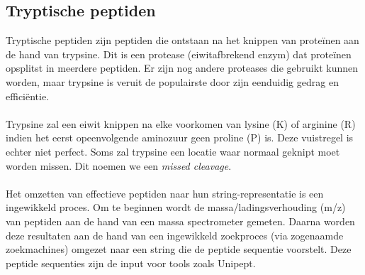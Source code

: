 \documentclass[11pt,dutch,faculty=we,layout=titlefont,underline=false,titleUppercase=true,titleUnderline=true]{ugent2016-report}
\begin{document}
    \subsection{Tryptische peptiden}\label{subsec:tryptische-peptiden}
    Tryptische peptiden zijn peptiden die ontstaan na het knippen van proteïnen aan de hand van trypsine.
    Dit is een protease (eiwitafbrekend enzym) dat proteïnen opsplitst in meerdere peptiden.
    Er zijn nog andere proteases die gebruikt kunnen worden, maar trypsine is veruit de populairste door zijn eenduidig gedrag en efficiëntie.
    \\ \\
    Trypsine zal een eiwit knippen na elke voorkomen van lysine (K) of arginine (R) indien het eerst opeenvolgende aminozuur geen proline (P) is.
    Deze vuistregel is echter niet perfect.
    Soms zal trypsine een locatie waar normaal geknipt moet worden missen.
    Dit noemen we een \textit{missed cleavage}.
    \\ \\
    Het omzetten van effectieve peptiden naar hun string-representatie is een ingewikkeld proces.
    Om te beginnen wordt de massa/ladingsverhouding (m/z) van peptiden aan de hand van een massa spectrometer gemeten.
    Daarna worden deze resultaten aan de hand van een ingewikkeld zoekproces (via zogenaamde zoekmachines) omgezet naar een string die de peptide sequentie voorstelt.
    Deze peptide sequenties zijn de input voor tools zoals Unipept.
\end{document}
